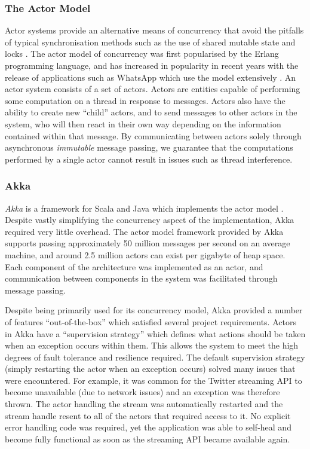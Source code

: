 \documentclass{l4proj}
\begin{document}
    \subsubsection{The Actor Model}

Actor systems provide an alternative means of concurrency that avoid the pitfalls of typical synchronisation methods such as the use of shared mutable state and locks \cite{actormodel}. The actor model of concurrency was first popularised by the Erlang programming language, and has increased in popularity in recent years with the release of applications such as WhatsApp which use the model extensively \cite{erlang}. An actor system consists of a set of actors. Actors are entities capable of performing some computation on a thread in response to messages. Actors also have the ability to create new “child” actors, and to send messages to other actors in the system, who will then react in their own way depending on the information contained within that message. By communicating between actors solely through asynchronous \textit{immutable} message passing, we guarantee that the computations performed by a single actor cannot result in issues such as thread interference.

\subsubsection{Akka}

    \textit{Akka} is a framework for Scala and Java which implements the actor model \cite{akka}. Despite vastly simplifying the concurrency aspect of the implementation, Akka required very little overhead. The actor model framework provided by Akka supports passing approximately 50 million messages per second on an average machine, and around 2.5 million actors can exist per gigabyte of heap space. Each component of the architecture was implemented as an actor, and communication between components in the system was facilitated through message passing.
            
        
        Despite being primarily used for its concurrency model, Akka provided a number of features ``out-of-the-box'' which satisfied several project requirements. Actors in Akka have a ``supervision strategy'' which defines what actions should be taken when an exception occurs within them. This allows the system to meet the high degrees of fault tolerance and resilience required. The default supervision strategy (simply restarting the actor when an exception occurs) solved many issues that were encountered. For example, it was common for the Twitter streaming API to become unavailable (due to network issues) and an exception was therefore thrown. The actor handling the stream was automatically restarted and the stream handle resent to all of the actors that required access to it. No explicit error handling code was required, yet the application was able to self-heal and become fully functional as soon as the streaming API became available again.
\end{document}
